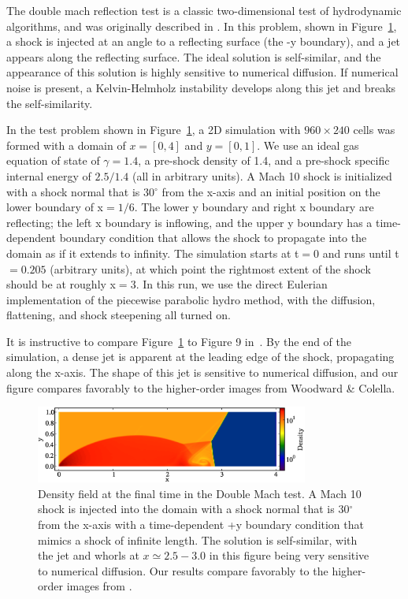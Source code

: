The double mach reflection test is a classic two-dimensional test of
hydrodynamic algorithms, and was originally described in
\citet{1984JCoPh..54..115W} \citep[and more recently
in][]{2008ApJS..178..137S}.  In this problem, shown in
Figure~\ref{fig.doublemach}, a shock is injected at an angle to a
reflecting surface (the -y boundary), and a jet appears along the
reflecting surface.  The ideal solution is self-similar, and the
appearance of this solution is highly sensitive to numerical
diffusion.  If numerical noise is present, a Kelvin-Helmholz
instability develops along this jet and breaks the self-similarity.

In the test problem shown in Figure~\ref{fig.doublemach}, a 2D
simulation with $960 \times 240$ cells was formed with a domain of $x
= [0, 4]$ and $y = [0, 1]$.  We use an ideal gas equation of state of
$\gamma = 1.4$, a pre-shock density of 1.4, and a pre-shock specific
internal energy of $2.5/1.4$ (all in arbitrary units).  A Mach 10
shock is initialized with a shock normal that is 30$^\circ$ from the
x-axis and an initial position on the lower boundary of x$ = 1/6$.
The lower y boundary and right x boundary are reflecting; the left x
boundary is inflowing, and the upper y boundary has a time-dependent
boundary condition that allows the shock to propagate into the domain
as if it extends to infinity.  The simulation starts at t$ = 0$ and
runs until t$ = 0.205$ (arbitrary units), at which point the rightmost
extent of the shock should be at roughly x$ = 3$.  In this run, we use
the direct Eulerian implementation of the piecewise parabolic hydro
method, with the diffusion, flattening, and shock steepening all
turned on.

It is instructive to compare Figure~\ref{fig.doublemach} to Figure 9
in~\citet{1984JCoPh..54..115W}.  By the end of the simulation, a dense
jet is apparent at the leading edge of the shock, propagating along
the x-axis.  The shape of this jet is sensitive to numerical
diffusion, and our figure compares favorably to the higher-order
images from Woodward \& Colella.

\begin{figure}
\begin{center}
\includegraphics[width=0.8\textwidth]{figures/DoubleMachTest.eps}
\caption{Density field at the final time in the Double Mach test.  A
Mach 10 shock is injected into the domain with a shock normal that is
30$^\circ$ from the x-axis with a time-dependent +y boundary condition
that mimics a shock of infinite length.  The solution is self-similar,
with the jet and whorls at $x \simeq 2.5-3.0$ in this figure being very sensitive
to numerical diffusion.  Our results compare favorably to the
higher-order images from \citet{1984JCoPh..54..115W}.}
\label{fig.doublemach}
\end{center}
\end{figure}

